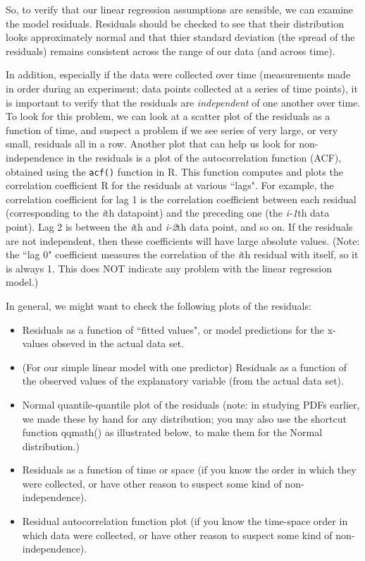 \documentclass[twoside]{book}\usepackage[]{graphicx}\usepackage[]{xcolor}
\newcounter{example}[section]
\begin{document}
So, to verify that our linear regression assumptions are sensible, we can examine the model residuals. Residuals should be checked to see that their distribution looks approximately
normal and that thier standard deviation (the spread of the residuals) remains consistent across the range of our data (and across time).

In addition, especially if the data were collected over time (measurements made in order during an experiment; data points collected at a series of time points), it is important to verify that the residuals are \emph{independent} of one another over time.  To look for this problem, we can look at a scatter plot of the residuals as a function of time, and suspect a problem if we see series of very large, or very small, residuals all in a row.  Another plot that can help us look for non-independence in the residuals is a plot of the autocorrelation function (ACF), obtained using the \texttt{acf()} function in R.  This function computes and plots the correlation coefficient R for the residuals at various ``lags".  For example, the correlation coefficient for lag 1 is the correlation coefficient between each residual (corresponding to the \textit{i}th datapoint) and the preceding one (the \textit{i-1}th data point).  Lag 2 is between the \textit{i}th and \textit{i-2}th data point, and so on.  If the residuals are not independent, then these coefficients will have large absolute values.  (Note: the ``lag 0" coefficient measures the correlation of the \textit{i}th residual with itself, so it is always 1.  This does NOT indicate any problem with the linear regression model.)

In general, we might want to check the following plots of the residuals:
\begin{itemize}
\item Residuals as a function of ``fitted values", or model predictions for the x-values obseved in the actual data set.
\item (For our simple linear model with one predictor) Residuals as a function of the observed values of the explanatory variable (from the actual data set).
\item Normal quantile-quantile plot of the residuals (note: in studying PDFs earlier, we made these by hand for any distribution; you may also use the shortcut function qqmath() as illustrated below, to make them for the Normal distribution.)
\item Residuals as a function of time or space (if you know the order in which they were collected, or have other reason to suspect some kind of non-independence).
\item Residual autocorrelation function plot (if you know the time-space order in which data were collected, or have other reason to suspect some kind of non-independence).
\end{itemize}
\end{document}
